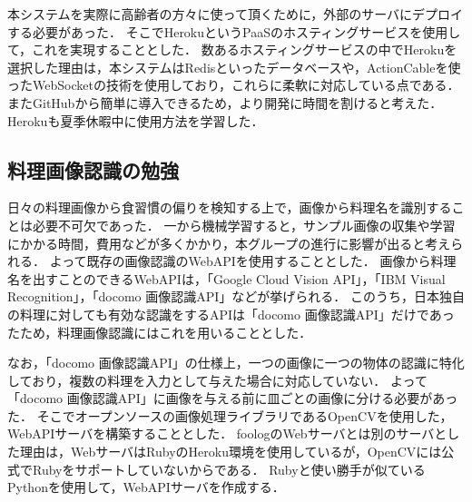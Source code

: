 \documentclass[../report]{subfiles}
\begin{document}
本システムを実際に高齢者の方々に使って頂くために，外部のサーバにデプロイする必要があった．
そこでHerokuというPaaSのホスティングサービスを使用して，これを実現することとした．
数あるホスティングサービスの中でHerokuを選択した理由は，本システムはRedisといったデータベースや，ActionCableを使ったWebSocketの技術を使用しており，これらに柔軟に対応している点である．
またGitHubから簡単に導入できるため，より開発に時間を割けると考えた．
Herokuも夏季休暇中に使用方法を学習した．


\subsection{料理画像認識の勉強}
日々の料理画像から食習慣の偏りを検知する上で，画像から料理名を識別することは必要不可欠であった．
一から機械学習すると，サンプル画像の収集や学習にかかる時間，費用などが多くかかり，本グループの進行に影響が出ると考えられる．
よって既存の画像認識のWebAPIを使用することとした．
画像から料理名を出すことのできるWebAPIは，「Google Cloud Vision API」，「IBM Visual Recognition」，「docomo 画像認識API」などが挙げられる．
このうち，日本独自の料理に対しても有効な認識をするAPIは「docomo 画像認識API」だけであったため，料理画像認識にはこれを用いることとした．

なお，「docomo 画像認識API」の仕様上，一つの画像に一つの物体の認識に特化しており，複数の料理を入力として与えた場合に対応していない．
よって「docomo 画像認識API」に画像を与える前に皿ごとの画像に分ける必要があった．
そこでオープンソースの画像処理ライブラリであるOpenCVを使用した，WebAPIサーバを構築することとした．
foologのWebサーバとは別のサーバとした理由は，WebサーバはRubyのHeroku環境を使用しているが，OpenCVには公式でRubyをサポートしていないからである．
Rubyと使い勝手が似ているPythonを使用して，WebAPIサーバを作成する．
\end{document}
